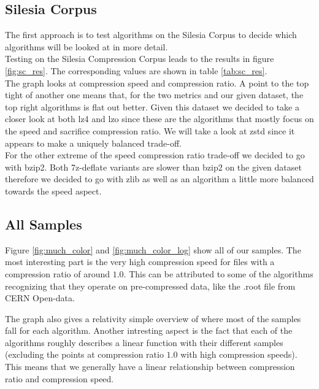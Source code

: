 \documentclass[
	12pt,
	a4paper,
	BCOR10mm,
	DIV14,
	listof=totoc,
	bibliography=totoc,
	headsepline
]{scrreprt}
\begin{document}
\subsection{Silesia Corpus}
The first approach is to test algorithms on the Silesia Corpus to decide which algorithms will be looked at in more detail.
\\
Testing on the Silesia Compression Corpus leads to the results in figure \ref{fig:sc_res}. 
The corresponding values are shown in table \ref{tab:sc_res}. \\






The graph looks at compression speed and compression ratio. A point to the top tight of another one means that, for the two metrics and our given dataset, the top right algorithms is flat out better. Given this dataset we decided to take a closer look at both lz4 and lzo since these are the algorithms that mostly focus on the speed and sacrifice compression ratio. We will take a look at zstd since it appears to make a uniquely balanced trade-off. \\
For the other extreme of the speed compression ratio trade-off we decided to go with bzip2. Both 7z-deflate variants are slower than bzip2 on the given dataset therefore we decided to go with zlib as well as an algorithm a little more balanced towards the speed aspect.






\subsection{All Samples}



Figure \ref{fig:much_color} and \ref{fig:much_color_log} show all of our samples. The most interesting part is the very high compression speed for files with a compression ratio of around $1.0$. This can be attributed to some of the algorithms recognizing that they operate on pre-compressed data, like the .root file from CERN Open-data.

The graph also gives a relativity simple overview of where most of the samples fall for each algorithm.
Another intresting aspect is the fact that each of the algorithms roughly describes a linear function with their different samples (excluding the points at compression ratio $1.0$ with high compression speeds).
This means that we generally have a linear relationship between compression ratio and compression speed.
\FloatBarrier
\end{document}
